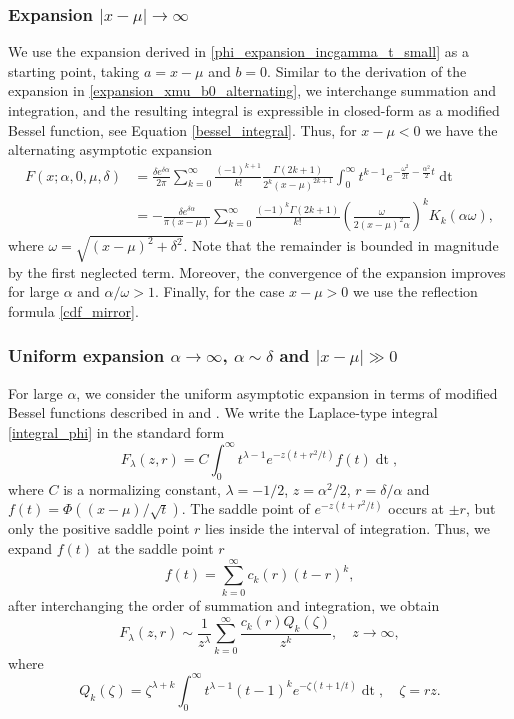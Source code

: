 \documentclass[10pt,a4paper,oneside]{article}
\numberwithin{equation}{section}
\begin{document}
\subsubsection{Expansion $|x-\mu| \to \infty$}
We use the expansion derived in \eqref{phi_expansion_incgamma_t_small} as a starting point, taking $a = x-\mu$ and $b = 0$. Similar to the derivation of the expansion in \eqref{expansion_xmu_b0_alternating}, we interchange summation and integration, and the resulting integral is expressible in closed-form as a modified Bessel function, see Equation \eqref{bessel_integral}. Thus, for $x - \mu < 0$ we have the alternating asymptotic expansion
\begin{align}
F(x; \alpha, 0, \mu, \delta) &= \frac{\delta e^{\delta \alpha}}{2\pi} \sum_{k=0}^{\infty} \frac{(-1)^{k+1}}{k!} \frac{\Gamma(2k + 1)}{2^k (x-\mu)^{2k + 1}} \int_0^{\infty} t^{k-1} e^{-\frac{\omega^2}{2t} - \frac{\alpha^2}{2}t} \mathop{dt} \nonumber \\
&= -\frac{\delta e^{\delta \alpha}}{\pi (x-\mu)} \sum_{k=0}^{\infty}\frac{(-1)^k\Gamma(2k + 1)}{k!} \left(\frac{\omega}{2(x-\mu)^2\alpha}\right)^k K_k(\alpha \omega),
\end{align}
where $\omega = \sqrt{(x-\mu)^2 + \delta^2}$. Note that the remainder is bounded in magnitude by the first neglected term. Moreover, the convergence of the expansion improves for large $\alpha$ and $\alpha / \omega > 1$. Finally, for the case $x - \mu > 0$ we use the reflection formula \eqref{cdf_mirror}.

\subsubsection{Uniform expansion $\alpha \to \infty$, $\alpha \sim \delta$ and $|x-\mu| \gg 0$}\label{uniform_expansion_alpha_large}
For large $\alpha$, we consider the uniform asymptotic expansion in terms of modified Bessel functions described in \cite{Temme1990c} and \cite[\S 27]{Temme2015}. We write the Laplace-type integral \eqref{integral_phi} in the standard form
\begin{equation*}
F_{\lambda}(z, r) = C\int_0^{\infty} t^{\lambda - 1} e^{-z\left(t + r^2/t\right)} f(t) \mathop{dt},
\end{equation*}
where $C$ is a normalizing constant, $\lambda=-1/2$, $z = \alpha^2/2$, $r=\delta/\alpha$ and $f(t) = \Phi((x-\mu)/\sqrt{t})$. The saddle point of $e^{-z\left(t + r^2/t\right)}$ occurs at $\pm r$, but only the positive saddle point $r$ lies inside the interval of integration. Thus, we expand $f(t)$ at the saddle point $r$
\begin{equation*}
f(t) = \sum_{k=0}^{\infty} c_k(r)(t-r)^k,
\end{equation*}
after interchanging the order of summation and integration, we obtain 
\begin{equation}
F_{\lambda}(z, r) \sim \frac{1}{z^{\lambda}} \sum_{k=0}^{\infty} \frac{c_k(r) Q_k(\zeta)}{z^k}, \quad z \to \infty,
\end{equation}
where
\begin{equation*}
Q_k(\zeta) = \zeta^{\lambda + k}\int_0^{\infty} t^{\lambda - 1}(t-1)^k e^{-\zeta(t + 1/t)} \mathop{dt}, \quad \zeta = rz.
\end{equation*}
\end{document}
